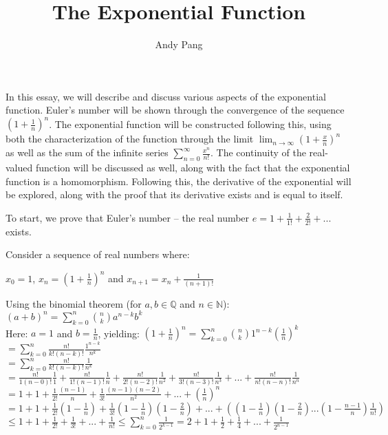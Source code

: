 \documentclass[12pt]{article}
\title{The Exponential Function}
\author{Andy Pang}
\date{}
\newcommand{\N}{\mathbb{N}}
\newcommand{\Q}{\mathbb{Q}}
\begin{document}
In this essay, we will describe and discuss various aspects of the exponential function. Euler's number will be shown through the convergence of the sequence $(1 + \frac{1}{n})^n$. The exponential function will be constructed following this, using both the characterization of the function through the limit $\lim_{n \rightarrow \infty} (1 + \frac{x}{n})^n$ as well as the sum of the infinite series $\sum_{n = 0}^\infty \frac {x^n}{n!}$. The continuity of the real-valued function will be discussed as well, along with the fact that the exponential function is a homomorphism. Following this, the derivative of the exponential will be explored, along with the proof that its derivative exists and is equal to itself.

To start, we prove that Euler's number -- the real number $e = 1 + \frac{1}{1!} + \frac{2}{2!} + ...$ exists. 

Consider a sequence of real numbers where:

$x_0 = 1$, $x_n = (1+\frac{1}{n})^n$ and $x_{n+1} = x_n + \frac{1}{(n+1)!}$


Using the binomial theorem (for $a,b \in \Q$ and $n \in \N$):\\

$(a+b)^n = \sum_{k=0}^n \binom{n}{k} a^{n-k} b^k$\\

Here: $a = 1$ and $b = \frac{1}{n}$, yielding: $(1+\frac{1}{n})^n = \sum_{k=0}^n \binom{n}{k} 1^{n-k} (\frac{1}{n})^k$\\

$= \sum_{k=0}^n \frac{n!}{k!(n-k)!} \frac{1^{n-k}}{n^k}$\\

$= \sum_{k=0}^n \frac{n!}{k!(n-k)!} \frac{1}{n^k}$\\

$= \frac{n!}{1(n-0)!} \frac{1}{1} + \frac{n!}{1!(n-1)!} \frac{1}{n} + \frac{n!}{2!(n-2)!} \frac{1}{n^2} + \frac{n!}{3!(n-3)!} \frac{1}{n^3} + ... + \frac{n!}{n!(n-n)!} \frac{1}{n^n}$\\

$=  1 + 1 + \frac{1}{2!}\frac{(n-1)}{n} + \frac{1}{3!}\frac{(n-1)(n-2)}{n^2} + ... + (\frac{1}{n})^n$\\


$=  1 + 1 + \frac{1}{2!}(1-\frac{1}{n}) + \frac{1}{3!}(1-\frac{1}{n})(1-\frac{2}{n}) + ... + ((1-\frac{1}{n})(1-\frac{2}{n})...(1-\frac{n-1}{n})\frac{1}{n!})$\\

$\leq 1 + 1 + \frac{1}{2!} + \frac{1}{3!} + ... + \frac{1}{n!} 
\leq \sum_{k=0}^n \frac{1}{2^{k-1}} = 2 + 1 + \frac{1}{2} + \frac{1}{4} + ... + \frac{1}{2^{n-1}}$\\
\end{document}
